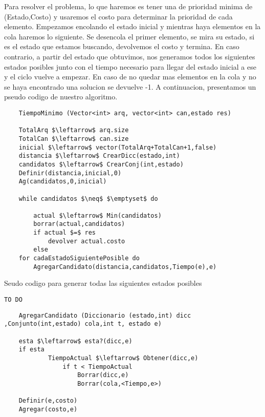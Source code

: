 	Para resolver el problema, lo que haremos es tener una de prioridad minima de  (Estado,Costo) y usaremos el costo para determinar la prioridad de cada elemento.
	Empezamos encolando el estado inicial y mientras haya elementos en la cola haremos lo siguiente.
	Se desencola el primer elemento, se mira su estado, si es el estado que estamos buscando, devolvemos el costo y termina.
	En caso contrario, a partir del estado que obtuvimos, nos generamos todos los siguientes estados posibles junto con el tiempo necesario para llegar del estado inicial a ese y el ciclo vuelve a empezar.
	En caso de no quedar mas elementos en la cola y no se haya encontrado una solucion se devuelve -1.
	A continuacion, presentamos un pseudo codigo de nuestro algoritmo.
	

\lstset{basicstyle=\large}
\begin{lstlisting}
	TiempoMinimo (Vector<int> arq, vector<int> can,estado res)

	TotalArq $\leftarrow$ arq.size
	TotalCan $\leftarrow$ can.size
	inicial $\leftarrow$ vector(TotalArq+TotalCan+1,false)
	distancia $\leftarrow$ CrearDicc(estado,int)
	candidatos $\leftarrow$ CrearConj(int,estado)
	Definir(distancia,inicial,0)
	Ag(candidatos,0,inicial)

	while candidatos $\neq$ $\emptyset$ do

		actual $\leftarrow$ Min(candidatos)
		borrar(actual,candidatos)
		if actual $=$ res
			devolver actual.costo
		else
	for cadaEstadoSiguientePosible do
		AgregarCandidato(distancia,candidatos,Tiempo(e),e)

\end{lstlisting} 

Seudo codigo para generar todas las siguientes estados posibles
\lstset{basicstyle=\large}

\begin{lstlisting}
TO DO
\end{lstlisting} 

\lstset{basicstyle=\large}
\begin{lstlisting}
	AgregarCandidato (Diccionario (estado,int) dicc ,Conjunto(int,estado) cola,int t, estado e)

	esta $\leftarrow$ esta?(dicc,e)
	if esta
			TiempoActual $\leftarrow$ Obtener(dicc,e)
				if t < TiempoActual
					Borrar(dicc,e)
					Borrar(cola,<Tiempo,e>)
 
	Definir(e,costo)
	Agregar(costo,e)

\end{lstlisting} 

